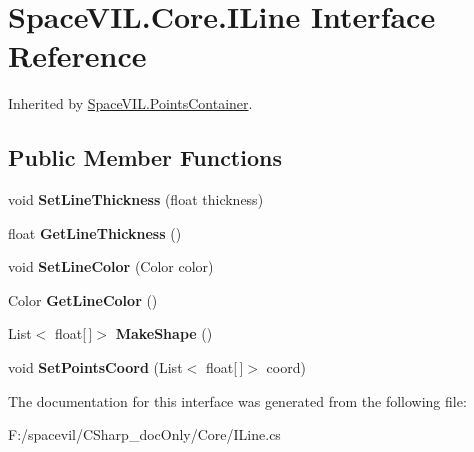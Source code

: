 \hypertarget{interface_space_v_i_l_1_1_core_1_1_i_line}{}\section{Space\+V\+I\+L.\+Core.\+I\+Line Interface Reference}
\label{interface_space_v_i_l_1_1_core_1_1_i_line}


Inherited by \mbox{\hyperlink{class_space_v_i_l_1_1_points_container}{Space\+V\+I\+L.\+Points\+Container}}.

\subsection*{Public Member Functions}
\begin{DoxyCompactItemize}
\item 
\mbox{\label{interface_space_v_i_l_1_1_core_1_1_i_line_acb10ebef121cdc2ba63aaf088bdd6529}} 
void {\bfseries Set\+Line\+Thickness} (float thickness)
\item 
\mbox{\label{interface_space_v_i_l_1_1_core_1_1_i_line_a4ca59e6fab1ab21ed067777f9c7394bc}} 
float {\bfseries Get\+Line\+Thickness} ()
\item 
\mbox{\label{interface_space_v_i_l_1_1_core_1_1_i_line_a01fbf6f699cbecf9ab32322c743351f9}} 
void {\bfseries Set\+Line\+Color} (Color color)
\item 
\mbox{\label{interface_space_v_i_l_1_1_core_1_1_i_line_aa8bf019f696af52bc2c37cd48b314d74}} 
Color {\bfseries Get\+Line\+Color} ()
\item 
\mbox{\label{interface_space_v_i_l_1_1_core_1_1_i_line_a5ee2b334c5452eeda1b57c63605386cf}} 
List$<$ float\mbox{[}$\,$\mbox{]}$>$ {\bfseries Make\+Shape} ()
\item 
\mbox{\label{interface_space_v_i_l_1_1_core_1_1_i_line_afbf7ee3a7286492b8f3833fa2dc3f886}} 
void {\bfseries Set\+Points\+Coord} (List$<$ float\mbox{[}$\,$\mbox{]}$>$ coord)
\end{DoxyCompactItemize}


The documentation for this interface was generated from the following file\+:\begin{DoxyCompactItemize}
\item 
F\+:/spacevil/\+C\+Sharp\+\_\+doc\+Only/\+Core/I\+Line.\+cs\end{DoxyCompactItemize}
